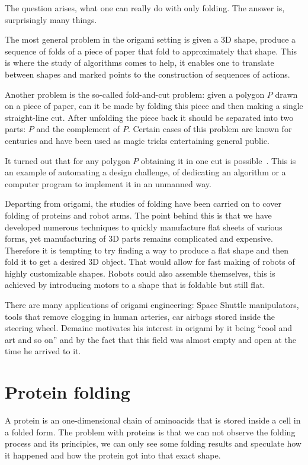 \documentclass[a4paper,12pt]{article}
\begin{document}
The question arises, what one can really do with only folding. The answer is, surprisingly many things.

The most general problem in the origami setting is given a 3D shape, produce a sequence of folds of a piece of paper that fold to approximately that shape. This is where the study of algorithms comes to help, it enables one to translate between shapes and marked points to the construction of sequences of actions.

Another problem is the so-called fold-and-cut problem: given a polygon \(P\) drawn on a piece of paper, can it be made by folding this piece and then making a single straight-line cut. After unfolding the piece back it should be separated into two parts: \(P\) and the complement of \(P\). Certain cases of this problem are known for centuries and have been used as magic tricks entertaining general public.

It turned out that for any polygon \(P\) obtaining it in one cut is possible~\cite{stcut}. This is an example of automating a design challenge, of dedicating an algorithm or a computer program to implement it in an unmanned way.

Departing from origami, the studies of folding have been carried on to cover folding of proteins and robot arms. The point behind this is that we have developed numerous techniques to quickly manufacture flat sheets of various forms, yet manufacturing of 3D parts remains complicated and expensive. Therefore it is tempting to try finding a way to produce a flat shape and then fold it to get a desired 3D object. That would allow for fast making of robots of highly customizable shapes. Robots could also assemble themselves, this is achieved by introducing motors to a shape that is foldable but still flat.

There are many applications of origami engineering: Space Shuttle manipulators, tools that remove clogging in human arteries, car airbags stored inside the steering wheel. Demaine motivates his interest in origami by it being “cool and art and so on” and by the fact that this field was almost empty and open at the time he arrived to it.

\section{Protein folding}

A protein is an one-dimensional chain of aminoacids that is stored inside a cell in a folded form. The problem with proteins is that we can not observe the folding process and its principles, we can only see some folding results and speculate how it happened and how the protein got into that exact shape.
\end{document}

